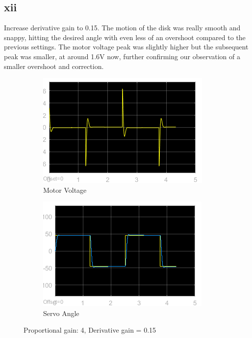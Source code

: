 \documentclass[12pt]{article}
\begin{document}
\subsection*{xii} %
Increase derivative gain to 0.15. The motion of the disk was really smooth and snappy, hitting the desired angle with even less of an overshoot compared to the previous settings. The motor voltage peak was slightly higher but the subsequent peak was smaller, at around 1.6V now, further confirming our observation of a smaller overshoot and correction.
\begin{figure}[h!]
    \centering
    \begin{subfigure}[b]{0.49\textwidth}
        \includegraphics[width=\textwidth]{xii_voltage}
        \caption{Motor Voltage}     
    \end{subfigure}
    \begin{subfigure}[b]{0.49\textwidth}
        \includegraphics[width=\textwidth]{xii_angle}
        \caption{Servo Angle}
    \end{subfigure}
    \caption{\label{fig:xii} Proportional gain: 4, Derivative gain = 0.15}
\end{figure}
\end{document}
